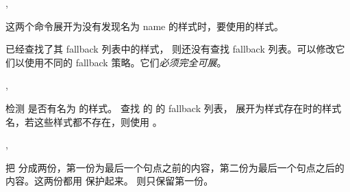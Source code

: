 \documentclass[class=article,openany]{cusdoc}[2025/10/10]
\begin{document}
\begin{function}[EXP]{\texhigh@fallback,\texhigh@fallback@}
  \begin{syntax}
    \V{\texhigh@fallback}   
    \V{\texhigh@fallback@}  
  \end{syntax}
这两个命令展开为没有发现名为 name 的样式时，要使用的样式。

 已经查找了其 fallback 列表中的样式， 则还没有查找 fallback 列表。可以修改它们以使用不同的 fallback 策略。它们\emph{必须完全可展}。
\end{function}

\begin{function}[EXP]{\texhigh@cat@if@exists,\texhigh@cat@fallback}
  \begin{syntax}
    \V{\texhigh@cat@if@exists}    
    \V{\texhigh@cat@fallback}   
  \end{syntax}
 检测  是否有名为  的样式。
 查找  的  的 fallback 列表，
展开为样式存在时的样式名，若这些样式都不存在，则使用 。
\end{function}

\begin{function}[EXP]{\texhigh@find@dotparent,\texhigh@dot@split}
  \begin{syntax}
    \V{\texhigh@dot@split} 
    \V{\texhigh@find@dotparent} 
  \end{syntax}
 把  分成两份，第一份为最后一个句点之前的内容，第二份为最后一个句点之后的内容。这两份都用  保护起来。
 则只保留第一份。
\end{function}

\begin{xample}
\makeatletter
\def\printstr#1{\detokenize\expandafter{\expanded{#1}}}
\printstr{\texhigh@dot@split {\a.b.c.\d}}\quad
\printstr{\texhigh@find@dotparent {\a.b.c.\d}}\quad
\makeatother
\stopxamplecode
{}
\xampleprint
\end{xample}
\end{document}
